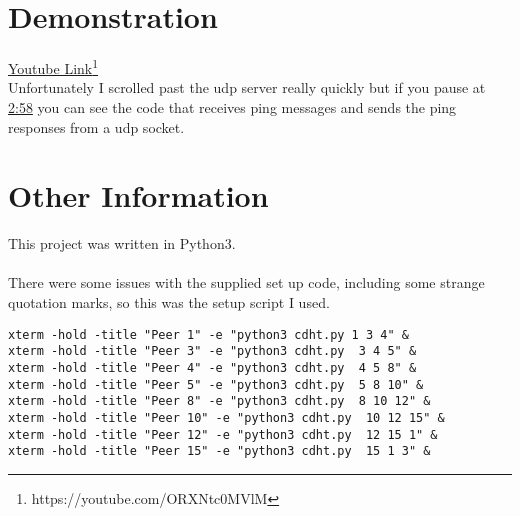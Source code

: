 \documentclass[a4paper]{article}
\begin{document}
\section{Demonstration}
\href{https://youtube.com/ORXNtc0MVlM}{Youtube Link}\footnote{https://youtube.com/ORXNtc0MVlM} \\

Unfortunately I scrolled past the udp server really quickly but if you pause at \href{https://youtube.com/ORXNtc0MVlM?t=2m58s}{2:58} you can see the code that receives ping messages and sends the ping responses from a udp socket.

\section{Other Information}
This project was written in Python3. \\ \\

There were some issues with the supplied set up code, including some strange quotation marks, so this was the setup script I used. 
\begin{verbatim}
xterm -hold -title "Peer 1" -e "python3 cdht.py 1 3 4" &
xterm -hold -title "Peer 3" -e "python3 cdht.py  3 4 5" &
xterm -hold -title "Peer 4" -e "python3 cdht.py  4 5 8" &
xterm -hold -title "Peer 5" -e "python3 cdht.py  5 8 10" &
xterm -hold -title "Peer 8" -e "python3 cdht.py  8 10 12" &
xterm -hold -title "Peer 10" -e "python3 cdht.py  10 12 15" &
xterm -hold -title "Peer 12" -e "python3 cdht.py  12 15 1" &
xterm -hold -title "Peer 15" -e "python3 cdht.py  15 1 3" &
\end{verbatim}
\end{document}

